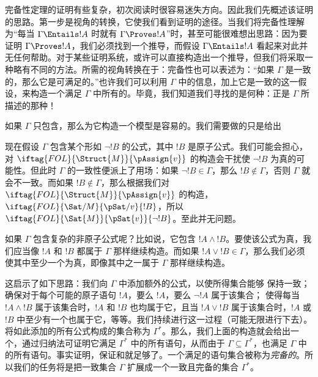 \documentclass[../../../include/open-logic-section]{subfiles}
\begin{document}
      {}
      {}


完备性定理的证明有些复杂，初次阅读时很容易迷失方向。因此我们先概述该证明的思路。第一步是视角的转换，它使我们看到证明的途径。当我们将完备性理解为“每当 $\Gamma \Entails !A$ 时就有 $\Gamma \Proves !A$”时，甚至可能很难想出思路：因为要证明 $\Gamma \Proves !A$，我们必须找到一个推导，而假设 $\Gamma \Entails !A$ 看起来对此并无任何帮助。对于某些证明系统，或许可以直接构造出一个推导，但我们将采取一种略有不同的方法。所需的视角转换在于：完备性也可以表述为：“如果 $\Gamma$ 是一致的，那么它是可满足的。”也许我们可以利用 $\Gamma$ 中的信息，加上它是一致的这一假设，来构造一个满足 $\Gamma$ 中所有的。毕竟，我们知道我们寻找的是何种：正是 $\Gamma$ 所描述的那种！

如果 $\Gamma$ 只包含，那么为它构造一个模型是容易的。我们需要做的只是给出

现在假设 $\Gamma$ 包含某个形如 $\lnot !B$ 的公式，其中 $!B$ 是原子公式。我们可能会担心，对 $\iftag{FOL}{\Struct{M}}{\pAssign{v}}$ 的构造会干扰使 $\lnot !B$ 为真的可能性。但此时 $\Gamma$ 的一致性便派上了用场：如果 $\lnot !B \in \Gamma$，那么 $!B \notin \Gamma$，否则 $\Gamma$ 就会不一致。而如果 $!B \notin \Gamma$，那么根据我们对 $\iftag{FOL}{\Struct{M}}{\pAssign{v}}$ 的构造，$\iftag{FOL}{\Sat/{M}}{\pSat/{v}}{!B}$，所以 $\iftag{FOL}{\Sat{M}}{\pSat{v}}{\lnot !B}$。至此并无问题。

如果 $\Gamma$ 包含复杂的非原子公式呢？比如说，它包含 $!A \land !B$。要使该公式为真，我们应当像 $!A$ 和 $!B$ 都属于 $\Gamma$ 那样继续构造。而如果 $!A \lor !B \in \Gamma$，那么我们必须使其中至少一个为真，即像其中之一属于 $\Gamma$ 那样继续构造。

这启示了如下思路：我们向 $\Gamma$ 中添加额外的公式，以使所得集合能够 保持一致； 确保对于每个可能的原子语句 $!A$，要么 $!A$，要么 $\lnot !A$ 属于该集合； 使得每当 $!A \land !B$ 属于该集合时，$!A$ 和 $!B$ 也均属于它，且当 $!A \lor !B$ 属于该集合时，$!A$ 或 $!B$ 中至少有一个也属于它，等等。我们持续进行这一过程（可能无限进行下去）。将如此添加的所有公式构成的集合称为 $\Gamma^*$。那么，我们上面的构造就会给出一个，通过归纳法可证明它满足 $\Gamma^*$ 中的所有语句，从而由于 $\Gamma \subseteq \Gamma^*$，也满足 $\Gamma$ 中的所有语句。事实证明，保证和就足够了。一个满足的语句集合被称为\emph{完备的}。所以我们的任务将是把一致集合 $\Gamma$ 扩展成一个一致且完备的集合 $\Gamma^*$。
\end{document}
